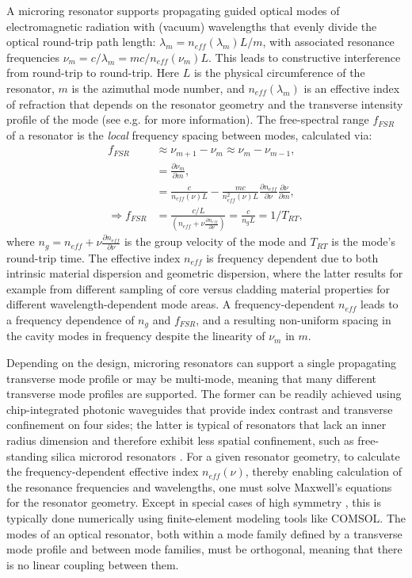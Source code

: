 A microring resonator supports propagating guided optical modes of electromagnetic radiation with (vacuum) wavelengths that evenly divide the optical round-trip path length: $\lambda_m=n_{eff}(\lambda_m)L/m$, with associated resonance frequencies $\nu_m=c/\lambda_m=mc/n_{eff}(\nu_m)L$. This leads to constructive interference from round-trip to round-trip. Here $L$ is the physical circumference of the resonator, $m$ is the azimuthal mode number, and $n_{eff}(\lambda_m)$ is an effective index of refraction that depends on the resonator geometry and the transverse intensity profile of the mode (see e.g. \cite{REFHERE} for more information). The free-spectral range $f_{FSR}$ of a resonator is the \textit{local} frequency spacing between modes, calculated via:
\begin{align}
	f_{FSR}&\approx \nu_{m+1}-\nu_{m}\approx \nu_{m}-\nu_{m-1},\\
	&=\frac{\partial\nu_m}{\partial m},\\
	&=\frac{c}{n_{eff}(\nu)L}-\frac{mc}{n_{eff}^2(\nu)L}\frac{\partial n_{eff}}{\partial \nu}\frac{\partial \nu}{\partial m},\\
	\Rightarrow f_{FSR}&=\frac{c/L}{\left(n_{eff}+\nu\frac{\partial n_{eff}}{\partial \nu}\right)}=\frac{c}{n_g L}=1/T_{RT},
\end{align}
	where $n_g=n_{eff}+\nu\frac{\partial n_{eff}}{\partial \nu}$ is the group velocity of the mode and $T_{RT}$ is the mode's round-trip time. The effective index $n_{eff}$ is frequency dependent due to both intrinsic material dispersion and geometric dispersion, where the latter results for example from different sampling of core versus cladding material properties for different wavelength-dependent mode areas. A frequency-dependent $n_{eff}$ leads to a frequency dependence of $n_g$ and $f_{FSR}$, and a resulting non-uniform spacing in the cavity modes in frequency despite the linearity of $\nu_m$ in $m$. 
	
	 Depending on the design, microring resonators can support a single propagating transverse mode profile or may be multi-mode, meaning that many different transverse mode profiles are supported. The former can be readily achieved using chip-integrated photonic waveguides that provide index contrast and transverse confinement on four sides; the latter is typical of resonators that lack an inner radius dimension and therefore exhibit less spatial confinement, such as free-standing silica microrod resonators \cite{DelHaye2013}. For a given resonator geometry, to calculate the frequency-dependent effective index $n_{eff}(\nu)$, thereby enabling calculation of the resonance frequencies and wavelengths, one must solve Maxwell's equations for the resonator geometry. Except in special cases of high symmetry \cite{Oraevsky2002}, this is typically done numerically using finite-element modeling tools like COMSOL. The modes of an optical resonator, both within a mode family defined by a transverse mode profile and between mode families, must be orthogonal\cite{Haus1984}, meaning that there is no linear coupling between them.

